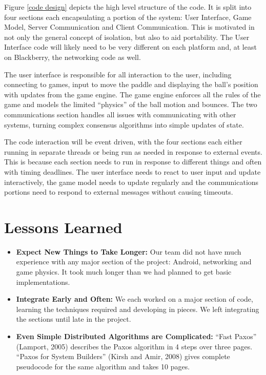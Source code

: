 \documentclass{sig-alternate}
\begin{document}
Figure \ref{code design} depicts the high level structure of the code.  It
is split into four sections each encapsulating a portion of the system:
User Interface, Game Model, Server Communication and Client Communication.
This is motivated in not only the general concept of isolation, but also to
aid portability.  The User Interface code will likely need to be very
different on each platform and, at least on Blackberry, the networking code
as well.

The user interface is responsible for all interaction to the user,
including connecting to games, input to move the paddle and displaying the
ball's position with updates from the game engine.  The game engine
enforces all the rules of the game and models the limited ``physics'' of
the ball motion and bounces.  The two communications section handles all
issues with communicating with other systems, turning complex consensus
algorithms into simple updates of state.

The code interaction will be event driven, with the four sections each
either running in separate threads or being run as needed in response to
external events.  This is because each section needs to run in response to
different things and often with timing deadlines.  The user interface needs
to react to user input and update interactively, the game model needs to
update regularly and the communications portions need to respond to
external messages without causing timeouts.

\section{Lessons Learned}
\label{lessons}

\begin{itemize}
	\item \textbf{Expect New Things to Take Longer:} Our team did not have
		much experience with any major section of the project: Android,
		networking and game physics.  It took much longer than we had
		planned to get basic implementations.
	\item \textbf{Integrate Early and Often:} We each worked on a major
		section of code, learning the techniques required and developing in
		pieces.  We left integrating the sections until late in the
		project.
	\item \textbf{Even Simple Distributed Algorithms are Complicated:}
		``Fast Paxos'' (Lamport, 2005) describes the Paxos algorithm in 4
		steps over three pages.  ``Paxos for System Builders'' (Kirsh and
		Amir, 2008) gives complete pseudocode for the same algorithm and
		takes 10 pages.
\end{itemize}
\end{document}
